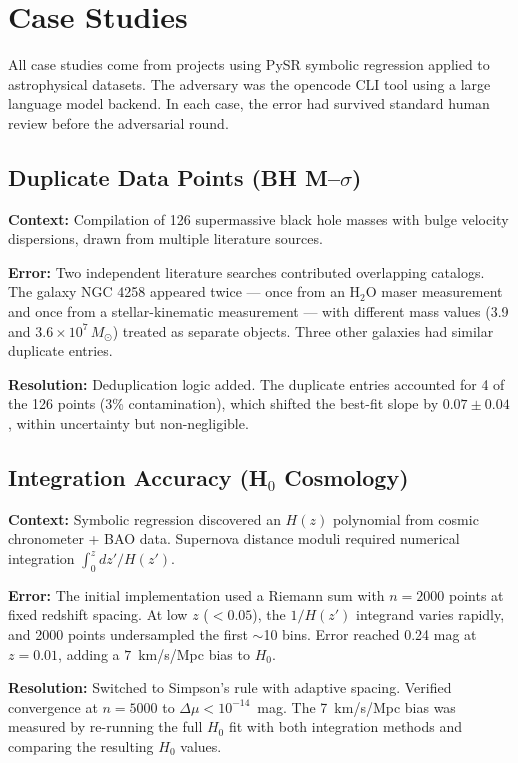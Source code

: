 \documentclass[twocolumn]{aastex631}
\begin{document}
\section{Case Studies}

All case studies come from projects using PySR symbolic regression applied
to astrophysical datasets.  The adversary was the opencode CLI tool using
a large language model backend.  In each case, the error had survived
standard human review before the adversarial round.

\subsection{Duplicate Data Points (BH M--$\sigma$)}

\textbf{Context:} Compilation of 126 supermassive black hole masses with
bulge velocity dispersions, drawn from multiple literature sources.

\textbf{Error:} Two independent literature searches contributed overlapping
catalogs.  The galaxy NGC 4258 appeared twice --- once from an H$_2$O maser
measurement and once from a stellar-kinematic measurement --- with different
mass values (3.9 and $3.6\times10^7\,M_\odot$) treated as separate objects.
Three other galaxies had similar duplicate entries.

\textbf{Resolution:} Deduplication logic added.  The duplicate entries
accounted for 4 of the 126 points (3\% contamination), which shifted the
best-fit slope by $0.07\pm0.04$, within uncertainty but non-negligible.

\subsection{Integration Accuracy (H$_0$ Cosmology)}

\textbf{Context:} Symbolic regression discovered an $H(z)$ polynomial from
cosmic chronometer + BAO data.  Supernova distance moduli required
numerical integration $\int_0^z dz'/H(z')$.

\textbf{Error:} The initial implementation used a Riemann sum with
$n=2000$ points at fixed redshift spacing.  At low $z$ ($<0.05$), the
$1/H(z')$ integrand varies rapidly, and 2000 points undersampled the
first $\sim$10 bins.  Error reached 0.24 mag at $z=0.01$, adding a
$7$~km/s/Mpc bias to $H_0$.

\textbf{Resolution:} Switched to Simpson's rule with adaptive spacing.
Verified convergence at $n=5000$ to $\Delta\mu < 10^{-14}$~mag.
The 7~km/s/Mpc bias was measured by re-running the full $H_0$ fit with
both integration methods and comparing the resulting $H_0$ values.
\end{document}
